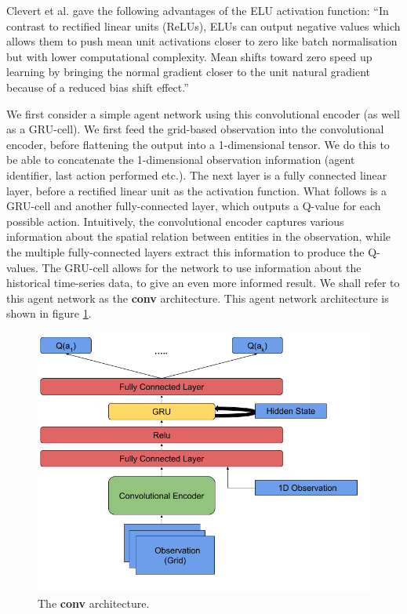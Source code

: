 Clevert et al. \cite{elu} gave the following advantages of the ELU activation function: ``In contrast to rectified linear units (ReLUs), ELUs can output negative values which allows them to push mean unit activations closer to zero like batch normalisation but with lower computational complexity. Mean shifts toward zero speed up learning by bringing the normal gradient closer to the unit natural gradient because of a reduced bias shift effect.''


We first consider a simple agent network using this convolutional encoder (as well as a GRU-cell). We first feed the grid-based observation into the convolutional encoder, before flattening the output into a 1-dimensional tensor. We do this to be able to concatenate the 1-dimensional observation information (agent identifier, last action performed etc.). The next layer is a fully connected linear layer, before a rectified linear unit as the activation function. What follows is a GRU-cell and another fully-connected layer, which outputs a Q-value for each possible action. Intuitively, the convolutional encoder captures various information about the spatial relation between entities in the observation, while the multiple fully-connected layers extract this information to produce the Q-values. The GRU-cell allows for the network to use information about the historical time-series data, to give an even more informed result. We shall refer to this agent network as the \textbf{conv} architecture. This agent network architecture is shown in figure \ref{fig:conv_agent_diagram}.

\begin{figure}
    \centering
    \includegraphics[scale=0.45]{images/agent_diagrams/rnn_conv_dpdpg_agent_diagram.png}
    \caption{The \textbf{conv} architecture.}
    \label{fig:conv_agent_diagram}
\end{figure}


